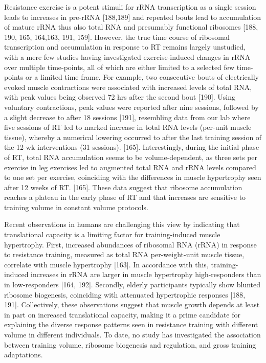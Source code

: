 \documentclass[twoside,10pt]{gihclass} %
\begin{document}
Resistance exercise is a potent stimuli for rRNA transcription as a single session leads to increases in pre-rRNA
{[}188,189{]}
and repeated bouts lead to accumulation of mature rRNA thus also total RNA and presumably functional ribosomes
{[}188, 190, 165, 164,163, 191, 159{]}.
However, the true time course of ribosomal transcription and accumulation in response to RT remains largely unstudied, with a mere few studies having investigated exercise-induced changes in rRNA over multiple time-points, all of which are either limited to a selected few time-points or a limited time frame.
For example, two consecutive bouts of electrically evoked muscle contractions were associated with increased levels of total RNA, with peak values being observed 72 hrs after the second bout
{[}190{]}.
Using voluntary contractions, peak values were reported after nine sessions, followed by a slight decrease to after 18 sessions {[}191{]},
resembling data from our lab where five sessions of RT led to marked increase in total RNA levels (per-unit muscle tissue), whereby a numerical lowering occurred to after the last training session of the 12 wk interventions (31 sessions).
{[}165{]}.
Interestingly, during the initial phase of RT, total RNA accumulation seems to be volume-dependent, as three sets per exercise in leg exercises led to augmented total RNA and rRNA levels compared to one set per exercise, coinciding with the differences in muscle hypertrophy seen after 12 weeks of RT.
{[}165{]}.
These data suggest that ribosome accumulation reaches a plateau in the early phase of RT and that increases are sensitive to training volume in constant volume protocols.

Recent observations in humans are challenging this view by indicating that translational capacity is a limiting factor for training-induced muscle hypertrophy. First, increased abundances of {ribosomal RNA (rRNA)} in response to resistance training, measured as total RNA per-weight-unit muscle tissue, correlate with muscle hypertrophy {[}163{]}.
In accordance with this, training-induced increases in rRNA are larger in muscle hypertrophy high-responders than in low-responders
{[}164, 192{]}.
Secondly, elderly participants typically show blunted ribosome biogenesis, coinciding with attenuated hypertrophic responses
{[}188, 191{]}.
Collectively, these observations suggest that muscle growth depends at least in part on increased translational capacity, making it a prime candidate for explaining the diverse response patterns seen in resistance training with different volume in different individuals. To date, no study has investigated the association between training volume, ribosome biogenesis and regulation, and gross training adaptations.
\end{document}
